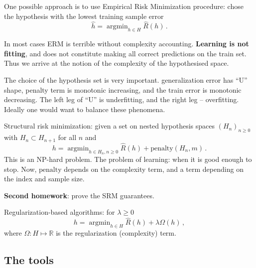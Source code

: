 \documentclass[a4paper]{article}
\newcommand{\Real}{\mathbb{R}}
\newcommand{\argmin}{\mathop{\text{argmin}}}
\begin{document}
One possible approach is to use Empirical Risk Minimization procedure: chose the hypothesis
with the lowest training sample error
\[ \hat{h} = \argmin_{h\in H} \hat{R}(h) \,. \]

In most cases ERM is terrible without complexity accounting. \textbf{Learning is not
fitting}, and does not constitute making all correct predictions on the train set.
Thus we arrive at the notion of the complexity of the hypothesised space.

The choice of the hypothesis set is very important. generalization error has ``U''
shape, penalty term is monotonic increasing, and the train error is monotonic decreasing.
The left leg of ``U'' is underfitting, and the right leg -- overfitting. Ideally one
would want to balance these phenomena.

Structural risk minimization: given a set on nested hypothesis spaces $(H_n)_{n\geq 0}$
with $H_n \subset H_{n+1}$ for all $n$ and
\[ h = \argmin_{h\in H_n, n\geq 0} \hat{R}(h) + \text{penalty}(H_n, m) \,. \]
This is an NP-hard problem. The problem of learning: when it is good enough to stop.
Now, $\text{penalty}$ depends on the complexity term, and a term depending on the
index and sample size.

\textbf{Second homework}: prove the SRM guarantees.

Regularization-based algorithms: for $\lambda \geq 0$
\[ h = \argmin_{h\in H}\hat{R}(h) + \lambda \Omega(h) \,, \]
where $\Omega:H \mapsto \Real$ is the regularization (complexity) term.


\subsection{The tools} %
\label{sub:the_tools}
\end{document}
